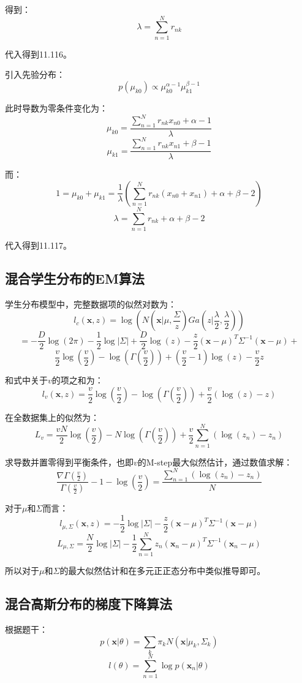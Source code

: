 \documentclass[UTF8]{ctexart}
\begin{document}
得到：
$$\lambda = \sum_{n=1}^{N}r_{nk}$$

代入得到11.116。

引入先验分布：
$$p(\mu_{k0})\propto \mu_{k0}^{\alpha-1}\mu_{k1}^{\beta-1}$$

此时导数为零条件变化为：
$$\mu_{k0}=\frac{\sum_{n=1}^{N}r_{nk}x_{n0}+\alpha-1}{\lambda}$$
$$\mu_{k1}=\frac{\sum_{n=1}^{N}r_{nk}x_{n1}+\beta-1}{\lambda}$$

而：
$$1=\mu_{k0}+\mu_{k1}=\frac{1}{\lambda}(\sum_{n=1}^{N}r_{nk}(x_{n0}+x_{n1})+\alpha+\beta-2)$$
$$\lambda = \sum_{n=1}^{N}r_{nk}+\alpha+\beta-2$$

代入得到11.117。

\subsection{混合学生分布的EM算法}
学生分布模型中，完整数据项的似然对数为：
$$l_{c}(\textbf{x},z)=\log(N(\textbf{x}|\mu,\frac{\Sigma}{z})Ga(z|\frac{\lambda}{2},\frac{\lambda}{2}))$$
$$=-\frac{D}{2}\log(2\pi)-\frac{1}{2}\log|\Sigma|+\frac{D}{2}\log(z)-\frac{z}{2}(\textbf{x}-\mu)^{T}\Sigma^{-1}(\textbf{x}-\mu)+$$
$$\frac{v}{2}\log (\frac{v}{2}) -\log(\Gamma(\frac{v}{2}))+(\frac{v}{2}-1)\log (z) - \frac{v}{2}z$$

和式中关于$v$的项之和为：
$$l_{v}(\textbf{x},z)=\frac{v}{2}\log(\frac{v}{2})-\log(\Gamma(\frac{v}{2}))+\frac{v}{2}(\log(z)-z)$$

在全数据集上的似然为：
$$L_{v}=\frac{vN}{2}\log(\frac{v}{2})-N\log(\Gamma(\frac{v}{2}))+\frac{v}{2}\sum_{n=1}^{N}(\log(z_{n})-z_{n})$$

求导数并置零得到平衡条件，也即$v$的M-step最大似然估计，通过数值求解：
$$\frac{\nabla\Gamma(\frac{v}{2})}{\Gamma(\frac{v}{2})}-1-\log(\frac{v}{2})=\frac{\sum_{n=1}^{N}(\log(z_{n})-z_{n})}{N}$$

对于$\mu$和$\Sigma$而言：
$$l_{\mu,\Sigma}(\textbf{x},z)=-\frac{1}{2}\log|\Sigma|-\frac{z}{2}(\textbf{x}-\mu)^{T}\Sigma^{-1}(\textbf{x}-\mu)$$
$$L_{\mu,\Sigma}=\frac{N}{2}\log|\Sigma|-\frac{1}{2}\sum_{n=1}^{N}z_{n}(\textbf{x}_{n}-\mu)^{T}\Sigma^{-1}(\textbf{x}_{n}-\mu)$$

所以对于$\mu$和$\Sigma$的最大似然估计和在多元正正态分布中类似推导即可。

\subsection{混合高斯分布的梯度下降算法}
根据题干：
$$p(\textbf{x}|\theta)=\sum_{k}\pi_{k}N(\textbf{x}|\mu_{k},\Sigma_{k})$$
$$l(\theta)=\sum_{n=1}^{N}\log p(\textbf{x}_{n}|\theta)$$
\end{document}
